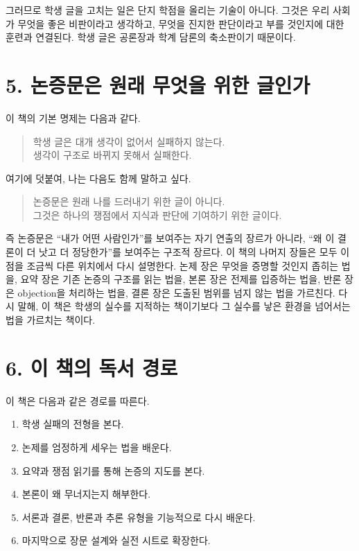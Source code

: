 그러므로 학생 글을 고치는 일은 단지 학점을 올리는 기술이 아니다. 그것은 우리 사회가 무엇을 좋은 비판이라고 생각하고, 무엇을 진지한 판단이라고 부를 것인지에 대한 훈련과 연결된다. 학생 글은 공론장과 학계 담론의 축소판이기 때문이다.

\section{5. 논증문은 원래 무엇을 위한 글인가}\label{5-uxb17cuxc99duxbb38uxc740-uxc6d0uxb798-uxbb34uxc5c7uxc744-uxc704uxd55c-uxae00uxc778uxac00}

이 책의 기본 명제는 다음과 같다.

\begin{quote}
학생 글은 대개 생각이 없어서 실패하지 않는다.\\
생각이 구조로 바뀌지 못해서 실패한다.
\end{quote}

여기에 덧붙여, 나는 다음도 함께 말하고 싶다.

\begin{quote}
논증문은 원래 나를 드러내기 위한 글이 아니다.\\
그것은 하나의 쟁점에서 지식과 판단에 기여하기 위한 글이다.
\end{quote}

즉 논증문은 ``내가 어떤 사람인가''를 보여주는 자기 연출의 장르가 아니라, ``왜 이 결론이 더 낫고 더 정당한가''를 보여주는 구조적 장르다. 이 책의 나머지 장들은 모두 이 점을 조금씩 다른 위치에서 다시 설명한다. 논제 장은 무엇을 증명할 것인지 좁히는 법을, 요약 장은 기존 논증의 구조를 읽는 법을, 본론 장은 전제를 입증하는 법을, 반론 장은 objection을 처리하는 법을, 결론 장은 도출된 범위를 넘지 않는 법을 가르친다. 다시 말해, 이 책은 학생의 실수를 지적하는 책이기보다 그 실수를 낳은 환경을 넘어서는 법을 가르치는 책이다.

\section{6. 이 책의 독서 경로}\label{6-uxc774-uxcc45uxc758-uxb3c5uxc11c-uxacbduxb85c}

이 책은 다음과 같은 경로를 따른다.

\begin{enumerate}
\def\labelenumi{\arabic{enumi}.}
\tightlist
\item
  학생 실패의 전형을 본다.
\item
  논제를 엄정하게 세우는 법을 배운다.
\item
  요약과 쟁점 읽기를 통해 논증의 지도를 본다.
\item
  본론이 왜 무너지는지 해부한다.
\item
  서론과 결론, 반론과 추론 유형을 기능적으로 다시 배운다.
\item
  마지막으로 장문 설계와 실전 시트로 확장한다.
\end{enumerate}

